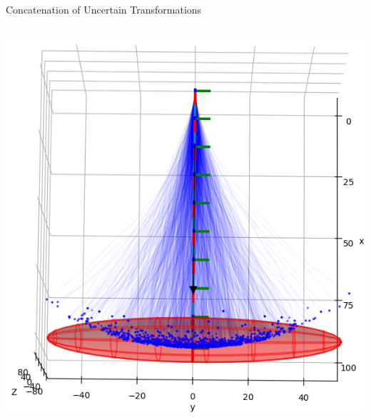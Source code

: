 \documentclass[14pt,aspectratio=169]{beamer}
\begin{document}
\begin{frame}[fragile]{Concatenation of Uncertain Transformations}
\begin{columns}
\begin{column}{0.4\textwidth}
{{\includegraphics[width=\textwidth]{images/state_estimation_2}}
}
\end{column}
\end{columns}
\end{frame}
\end{document}
